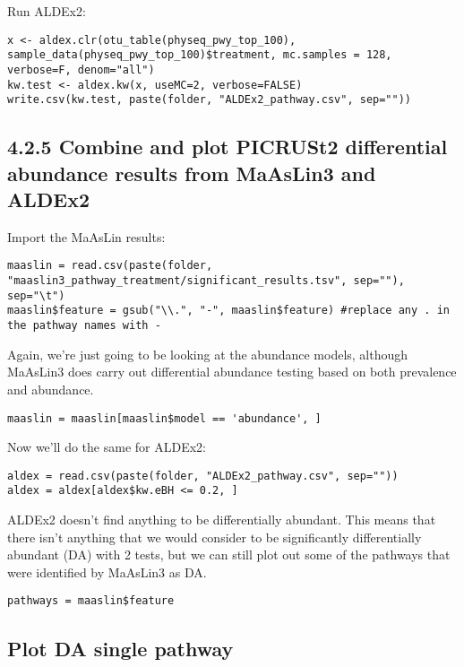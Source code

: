 \documentclass[
]{book}
\begin{document}
Run ALDEx2:

\begin{verbatim}
x <- aldex.clr(otu_table(physeq_pwy_top_100), sample_data(physeq_pwy_top_100)$treatment, mc.samples = 128, verbose=F, denom="all")
kw.test <- aldex.kw(x, useMC=2, verbose=FALSE)
write.csv(kw.test, paste(folder, "ALDEx2_pathway.csv", sep=""))
\end{verbatim}

\subsection{4.2.5 Combine and plot PICRUSt2 differential abundance results from MaAsLin3 and ALDEx2}\label{combine-and-plot-picrust2-differential-abundance-results-from-maaslin3-and-aldex2}

Import the MaAsLin results:

\begin{verbatim}
maaslin = read.csv(paste(folder, "maaslin3_pathway_treatment/significant_results.tsv", sep=""), sep="\t")
maaslin$feature = gsub("\\.", "-", maaslin$feature) #replace any . in the pathway names with -
\end{verbatim}

Again, we're just going to be looking at the abundance models, although MaAsLin3 does carry out differential abundance testing based on both prevalence and abundance.

\begin{verbatim}
maaslin = maaslin[maaslin$model == 'abundance', ]
\end{verbatim}

Now we'll do the same for ALDEx2:

\begin{verbatim}
aldex = read.csv(paste(folder, "ALDEx2_pathway.csv", sep=""))
aldex = aldex[aldex$kw.eBH <= 0.2, ]
\end{verbatim}

ALDEx2 doesn't find anything to be differentially abundant. This means that there isn't anything that we would consider to be significantly differentially abundant (DA) with 2 tests, but we can still plot out some of the pathways that were identified by MaAsLin3 as DA.

\begin{verbatim}
pathways = maaslin$feature
\end{verbatim}

\subsection{Plot DA single pathway}\label{plot-da-single-pathway}
\end{document}
